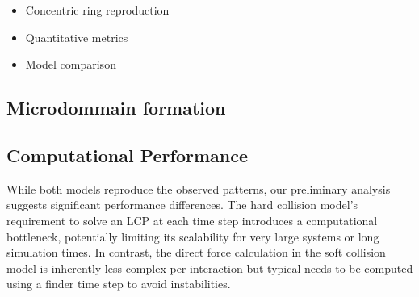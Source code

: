 \documentclass[conference]{IEEEtran}
\newlength{\subfigwidth}
\newcommand{\growthcomparisonrow}[6]{%
    #1 &
    \begin{subfigure}[b]{\subfigwidth}
        \texttt{[image: figures/growth\_comparison\_lambda\_\#2/\#1.\#3.png]}
    \end{subfigure} &
    \begin{subfigure}[b]{\subfigwidth}
        \texttt{[image: figures/growth\_comparison\_lambda\_\#2/\#1.\#4.png]}
    \end{subfigure} &
    \begin{subfigure}[b]{\subfigwidth}
        \texttt{[image: figures/growth\_comparison\_lambda\_\#2/\#1.\#5.png]}
    \end{subfigure} &
    \begin{subfigure}[b]{\subfigwidth}
        \texttt{[image: figures/growth\_comparison\_lambda\_\#2/\#1.\#6.png]}
    \end{subfigure}  \\
}
\begin{document}





\begin{itemize}
    \item Concentric ring reproduction
    \item Quantitative metrics
    \item Model comparison
\end{itemize}



\subsection{Microdommain formation}

\cite{You2018}





\newpage

\subsection{Computational Performance}

While both models reproduce the observed patterns, our preliminary analysis suggests significant performance differences. The hard collision model's requirement to solve an LCP at each time step introduces a computational bottleneck, potentially limiting its scalability for very large systems or long simulation times. In contrast, the direct force calculation in the soft collision model is inherently less complex per interaction but typical needs to be computed using a finder time step to avoid instabilities.
\end{document}
